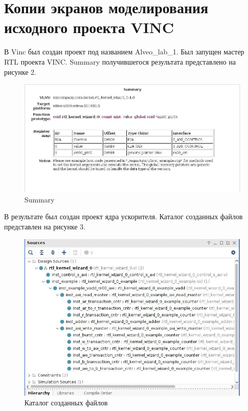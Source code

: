 \section*{Копии экранов моделирования исходного проекта VINC}
В Vinc был создан проект под названием Alveo\_lab\_1.
Был запущен мастер RTL проекта VINC.
Summary получившегося результата представлено на рисунке 2.

\FloatBarrier
\begin{figure}[h]
	\begin{center}
		\includegraphics[width=\linewidth]{inc/summary.png}
	\end{center}
	\caption{Summary}
\end{figure}
\FloatBarrier

В результате был создан проект ядра ускорителя.
Каталог созданных файлов представлен на рисунке 3.

\FloatBarrier
\begin{figure}[h]
	\begin{center}
		\includegraphics[]{inc/newfiles.png}
	\end{center}
	\caption{Каталог созданных файлов}
\end{figure}
\FloatBarrier

